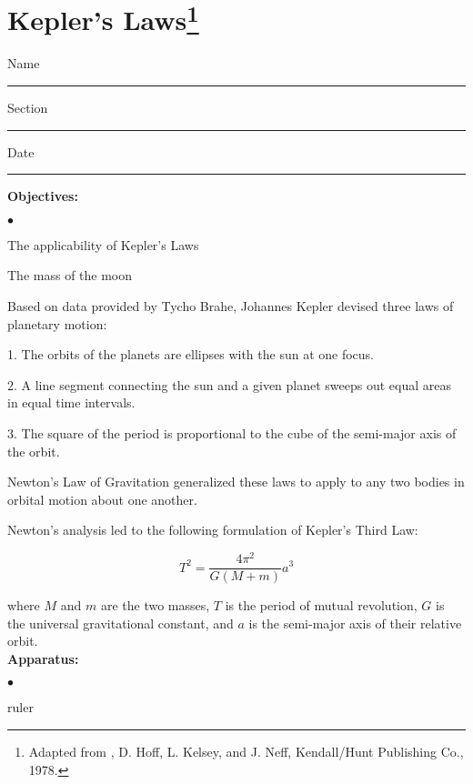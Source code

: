 
\section{Kepler's Laws\footnote{
Adapted from , D. Hoff, L. Kelsey, and J.
Neff, Kendall/Hunt Publishing Co., 1978.
}}

Name \rule{2.0in}{0.1pt}\hfill{}Section \rule{1.0in}{0.1pt}\hfill{}Date \rule{1.0in}{0.1pt}

{\noindent \bf Objectives:} \begin{list}{$\bullet$}{\itemsep0pt }

\item The applicability of Kepler's Laws \item The mass of the moon

\end{list}


\noindent Based on data provided by Tycho Brahe, Johannes Kepler devised three laws of planetary motion:

1. The orbits of the planets are ellipses with the sun at one focus.

2. A line segment connecting the sun and a given planet sweeps out equal areas in equal time intervals.

3. The square of the period is proportional to the cube of the semi-major axis of the orbit.

\noindent Newton's Law of Gravitation generalized these laws to apply to any two bodies in orbital motion about one another.

\noindent Newton's analysis led to the following formulation of Kepler's Third Law:

\begin{equation} T^2 = \frac{4\pi^2}{G(M + m)}a^3 \end{equation}

\noindent where $M$ and $m$ are the two masses, $T$ is the period of mutual revolution, $G$ is the universal gravitational constant, and $a$ is the semi-major axis of their relative orbit. \\

{\noindent \bf Apparatus:} \begin{list}{$\bullet$}{\itemsep0pt }

\item ruler

\end{list}

